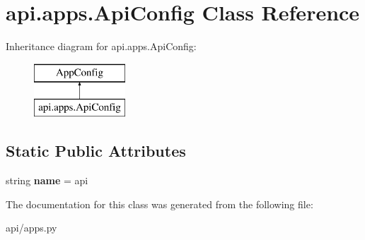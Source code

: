\hypertarget{classapi_1_1apps_1_1_api_config}{}\section{api.\+apps.\+Api\+Config Class Reference}
\label{classapi_1_1apps_1_1_api_config}
Inheritance diagram for api.\+apps.\+Api\+Config\+:\begin{figure}[H]
\begin{center}
\leavevmode
\includegraphics[height=2.000000cm]{classapi_1_1apps_1_1_api_config}
\end{center}
\end{figure}
\subsection*{Static Public Attributes}
\begin{DoxyCompactItemize}
\item 
\mbox{\label{classapi_1_1apps_1_1_api_config_a0522ec96b80f15fd5f61aaabd032e107}} 
string {\bfseries name} = \textquotesingle{}api\textquotesingle{}
\end{DoxyCompactItemize}


The documentation for this class was generated from the following file\+:\begin{DoxyCompactItemize}
\item 
api/apps.\+py\end{DoxyCompactItemize}
